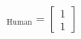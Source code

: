 \documentclass[preview]{standalone}
\begin{document}
\begin{align*}
[\mathbf{x}]_{\text{Human}} = \begin{bmatrix} 1 \\ 1 \end{bmatrix}
\end{align*}
\end{document}
